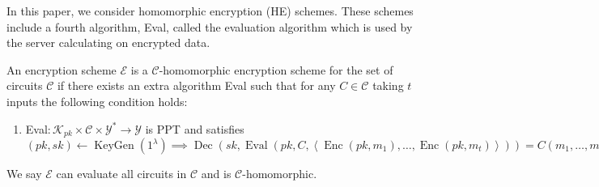 In this paper, we consider homomorphic encryption (HE) schemes. These schemes include a fourth algorithm, Eval, called the evaluation algorithm which is used by the server calculating on encrypted data.
\begin{definition}
    \label{def:HE-scheme}
An encryption scheme $\mathcal{E}$ is a $\mathcal{C}$-homomorphic encryption scheme for the set of circuits $\mathcal{C}$ if there exists an extra algorithm Eval such that for any $C \in \mathcal{C}$ taking $t$ inputs the following condition holds:
\begin{enumerate}[label={$\bullet$}]
    \item  Eval$ \colon  \mathcal{K}_{pk} \times \mathcal{C} \times \mathcal{Y}^* \to \mathcal{Y}$ is PPT and satisfies $(pk,sk) \leftarrow \operatorname{KeyGen}(1^{\lambda}) \implies \operatorname{Dec}(sk, \operatorname{Eval}(pk, C, \left\langle \operatorname{Enc}(pk, m_1), \dots , \operatorname{Enc}(pk, m_t) \right\rangle)) = C(m_1, \ldots, m_t)$
\end{enumerate}
We say $\mathcal{E}$ can evaluate all circuits in $\mathcal{C}$ and is $\mathcal{C}$-homomorphic.
\end{definition}


